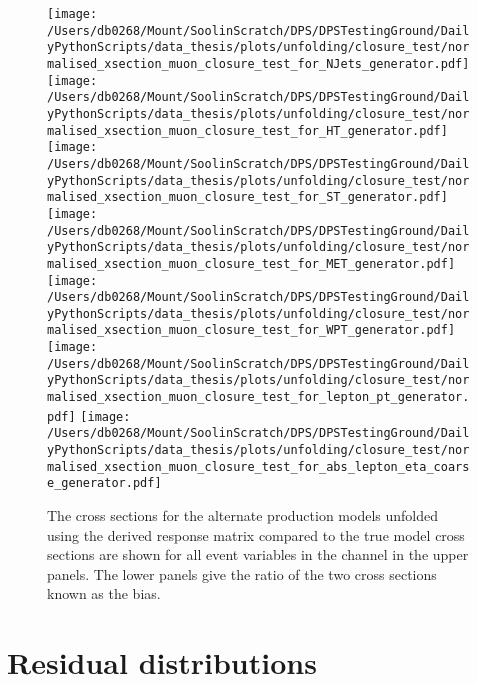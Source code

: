 \begin{figure*}[htpb]
	\centering
	\texttt{[image: /Users/db0268/Mount/SoolinScratch/DPS/DPSTestingGround/DailyPythonScripts/data\_thesis/plots/unfolding/closure\_test/normalised\_xsection\_muon\_closure\_test\_for\_NJets\_generator.pdf]}
	\texttt{[image: /Users/db0268/Mount/SoolinScratch/DPS/DPSTestingGround/DailyPythonScripts/data\_thesis/plots/unfolding/closure\_test/normalised\_xsection\_muon\_closure\_test\_for\_HT\_generator.pdf]}
	\texttt{[image: /Users/db0268/Mount/SoolinScratch/DPS/DPSTestingGround/DailyPythonScripts/data\_thesis/plots/unfolding/closure\_test/normalised\_xsection\_muon\_closure\_test\_for\_ST\_generator.pdf]} \\
	\texttt{[image: /Users/db0268/Mount/SoolinScratch/DPS/DPSTestingGround/DailyPythonScripts/data\_thesis/plots/unfolding/closure\_test/normalised\_xsection\_muon\_closure\_test\_for\_MET\_generator.pdf]} 
	\texttt{[image: /Users/db0268/Mount/SoolinScratch/DPS/DPSTestingGround/DailyPythonScripts/data\_thesis/plots/unfolding/closure\_test/normalised\_xsection\_muon\_closure\_test\_for\_WPT\_generator.pdf]} \\
	\texttt{[image: /Users/db0268/Mount/SoolinScratch/DPS/DPSTestingGround/DailyPythonScripts/data\_thesis/plots/unfolding/closure\_test/normalised\_xsection\_muon\_closure\_test\_for\_lepton\_pt\_generator.pdf]} 
	\texttt{[image: /Users/db0268/Mount/SoolinScratch/DPS/DPSTestingGround/DailyPythonScripts/data\_thesis/plots/unfolding/closure\_test/normalised\_xsection\_muon\_closure\_test\_for\_abs\_lepton\_eta\_coarse\_generator.pdf]} \\
	\caption[The cross sections for the alternate \ttbar{} production models unfolded using the \powhegpythia{} derived response matrix compared to the true model cross sections are shown for all event variables in the \muJets{} channel in the upper panels. The lower panels give the ratio of the two cross sections known as the bias.]{The cross sections for the alternate \ttbar{} production models unfolded using the \powhegpythia{} derived response matrix compared to the true model cross sections are shown for all event variables in the \muJets{} channel in the upper panels. The lower panels give the ratio of the two cross sections known as the bias.}
	\label{fig:ClosureBiasmu2}
\end{figure*}

\chapter{Residual distributions}
\label{ch:Res}

